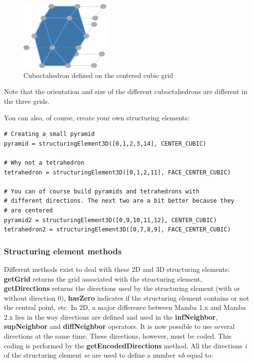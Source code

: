 \documentclass[a4paper,10pt,oneside]{article}
\begin{document}
\begin{figure}
\centering
\includegraphics[width=0.4\textwidth]{figures/Cuboc_on_ccubic.pdf}
\caption{Cuboctahedron defined on the centered cubic grid}
\label{fig:cuboc_cc}
\end{figure}

Note that the orientation and size of the different cuboctahedrons are different
in the three grids.

You can also, of course, create your own structuring elements:

\lstset{language=Python}
\begin{lstlisting}
# Creating a small pyramid
pyramid = structuringElement3D([0,1,2,3,14], CENTER_CUBIC)

# Why not a tetrahedron
tetrahedron = structuringElement3D([0,1,2,11], FACE_CENTER_CUBIC)

# You can of course build pyramids and tetrahedrons with
# different directions. The next two are a bit better because they
# are centered
pyramid2 = structuringElement3D([0,9,10,11,12], CENTER_CUBIC)
tetrahedron2 = structuringElement3D([0,7,8,9], FACE_CENTER_CUBIC)
\end{lstlisting}

\subsubsection{Structuring element methods}

 Different methods exist to deal with these 2D and
3D structuring elements: \textbf{getGrid} returns the grid associated with the structuring element, \textbf{getDirections} returns the
directions used by the structuring element (with or without direction 0), \textbf{hasZero} indicates if the structuring element contains
or not the central point, etc.
In 2D, a major difference between Mamba 1.x and Mamba 2.x lies in the way directions are defined and used in the \textbf{infNeighbor}, \textbf{supNeighbor}
and \textbf{diffNeighbor} operators. It is now possible to use several directions at the same time. These directions, however, must be coded.
This coding is performed by the \textbf{getEncodedDirections} method. All the directions \emph{i} of the structuring element \emph{se} are used to define a
number \emph{nb} equal to:
\end{document}
